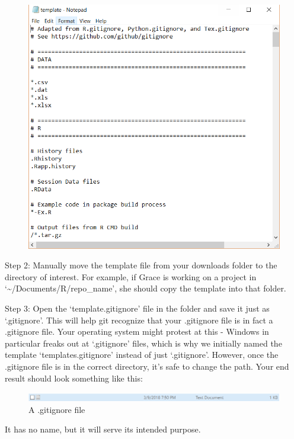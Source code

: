 \documentclass[]{book}
\begin{document}
\begin{figure}
\centering
\includegraphics{images/gitignore.PNG}
\caption{}
\end{figure}

Step 2: Manually move the template file from your downloads folder to
the directory of interest. For example, if Grace is working on a project
in `\textasciitilde{}/Documents/R/repo\_name', she should copy the
template into that folder.

Step 3: Open the `template.gitignore' file in the folder and save it
just as `.gitignore'. This will help git recognize that your .gitignore
file is in fact a .gitignore file. Your operating system might protest
at this - Windows in particular freaks out at `.gitignore' files, which
is why we initially named the template `templates.gitignore' instead of
just `.gitignore'. However, once the .gitignore file is in the correct
directory, it's safe to change the path. Your end result should look
something like this:

\begin{figure}
\centering
\includegraphics{images/gitignore2.PNG}
\caption{A .gitignore file}
\end{figure}

It has no name, but it will serve its intended purpose.
\end{document}
